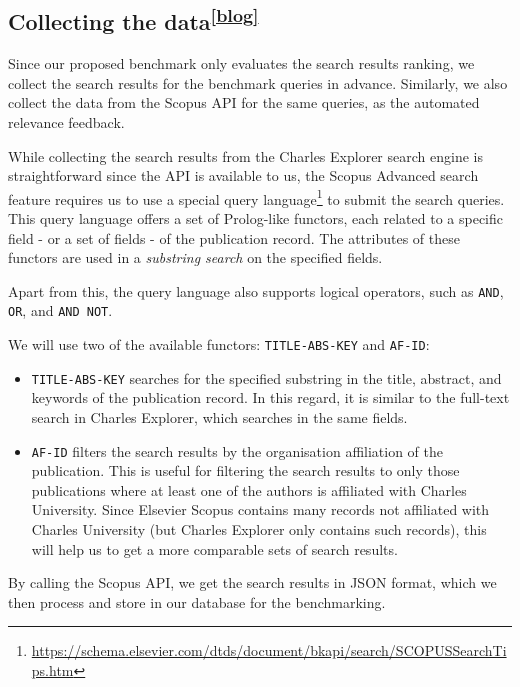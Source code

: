 \subsection[Collecting the data]{Collecting the data\textsuperscript{\href{https://barjin.github.io/edu/thesis-blog/collecting-data/}{[blog]}}}

Since our proposed benchmark only evaluates the search results ranking, we collect the search results for the benchmark queries in advance.
Similarly, we also collect the data from the Scopus API for the same queries, as the automated relevance feedback.

While collecting the search results from the Charles Explorer search engine is straightforward since the API is available to us, 
the Scopus Advanced search feature requires us to use a special query language\footnote{\url{https://schema.elsevier.com/dtds/document/bkapi/search/SCOPUSSearchTips.htm}} to submit the search queries. 
This query language offers a set of Prolog-like functors, 
each related to a specific field - or a set of fields - of the publication record. 
The attributes of these functors are used in a \textit{substring search} on the specified fields.

Apart from this, the query language also supports logical operators, such as \texttt{AND}, \texttt{OR}, and \texttt{AND NOT}.

We will use two of the available functors: \texttt{TITLE-ABS-KEY} and \texttt{AF-ID}:

\begin{itemize}
    \item \texttt{TITLE-ABS-KEY} searches for the specified substring in the title, abstract, and keywords of the publication record. 
    In this regard, it is similar to the full-text search in Charles Explorer, which searches in the same fields.
    \item \texttt{AF-ID} filters the search results by the organisation affiliation of the publication. This is useful for filtering the search results to only those publications where at least one of the authors is affiliated with Charles University. Since Elsevier Scopus contains many records not affiliated with Charles University (but Charles Explorer only contains such records), this will help us to get a more comparable sets of search results.
\end{itemize}

By calling the Scopus API, we get the search results in JSON format, which we then process and store in our database for the benchmarking.


